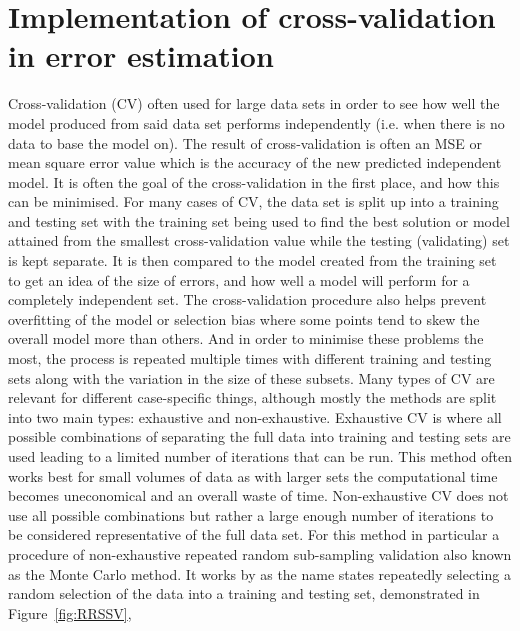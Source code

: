 \section{Implementation of cross-validation in error estimation}
Cross-validation (CV) often used for large data sets in order to see how well the model produced from said data set performs independently (i.e. when there is no data to base the model on). The result of cross-validation is often an MSE or mean square error value which is the accuracy of the new predicted independent model. It is often the goal of the cross-validation in the first place, and how this can be minimised. For many cases of CV, the data set is split up into a training and testing set with the training set being used to find the best solution or model attained from the smallest cross-validation value while the testing (validating) set is kept separate. It is then compared to the model created from the training set to get an idea of the size of errors, and how well a model will perform for a completely independent set. The cross-validation procedure also helps prevent overfitting of the model or selection bias where some points tend to skew the overall model more than others. And in order to minimise these problems the most, the process is repeated multiple times with different training and testing sets along with the variation in the size of these subsets.
Many types of CV are relevant for different case-specific things, although mostly the methods are split into two main types: exhaustive and non-exhaustive. Exhaustive CV is where all possible combinations of separating the full data into training and testing sets are used leading to a limited number of iterations that can be run. This method often works best for small volumes of data as with larger sets the computational time becomes uneconomical and an overall waste of time. Non-exhaustive CV does not use all possible combinations but rather a large enough number of iterations to be considered representative of the full data set.
For this method in particular a procedure of non-exhaustive repeated random sub-sampling validation also known as the Monte Carlo method. It works by as the name states repeatedly selecting a random selection of the data into a training and testing set, demonstrated in Figure~\ref{fig:RRSSV},
